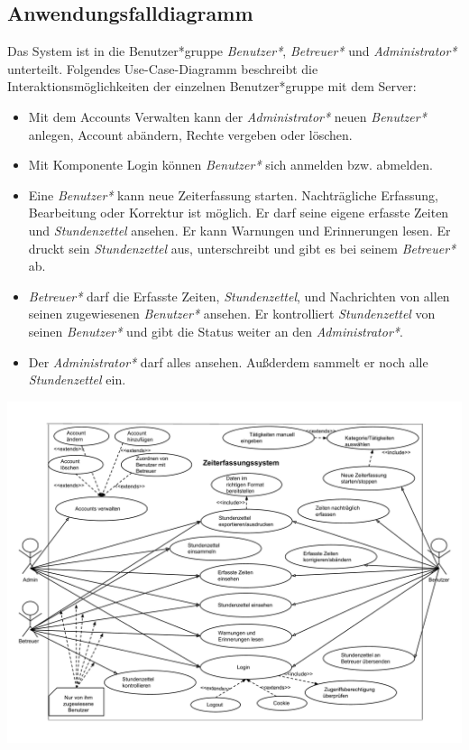 \newpage
\subsection{Anwendungsfalldiagramm}
Das System ist in die Benutzer*gruppe \emph{Benutzer*}, \emph{Betreuer*} und \emph{Administrator*} unterteilt. Folgendes Use-Case-Diagramm beschreibt die Interaktionsmöglichkeiten der einzelnen Benutzer*gruppe mit dem Server:
\begin{itemize}
	\item Mit dem Accounts Verwalten kann der \emph{Administrator*} neuen \emph{Benutzer*} anlegen, Account abändern, Rechte vergeben oder löschen.
	\item Mit Komponente Login können \emph{Benutzer*} sich anmelden bzw. abmelden.
	\item Eine \emph{Benutzer*} kann neue Zeiterfassung starten. Nachträgliche Erfassung, Bearbeitung oder Korrektur ist möglich. Er darf seine eigene erfasste Zeiten und \emph{Stundenzettel} ansehen. Er kann Warnungen und Erinnerungen lesen. Er druckt sein \emph{Stundenzettel} aus, unterschreibt und gibt es bei seinem \emph{Betreuer*} ab.
	\item \emph{Betreuer*} darf die Erfasste Zeiten, \emph{Stundenzettel}, und Nachrichten von allen seinen zugewiesenen \emph{Benutzer*} ansehen. Er kontrolliert \emph{Stundenzettel} von seinen \emph{Benutzer*} und gibt die Status weiter an den \emph{Administrator*}.
	\item Der \emph{Administrator*} darf alles ansehen. Außderdem sammelt er noch alle \emph{Stundenzettel} ein.
\end{itemize}


\includegraphics[width=\linewidth]{Anwendungsfalldiagramm.pdf}\\
